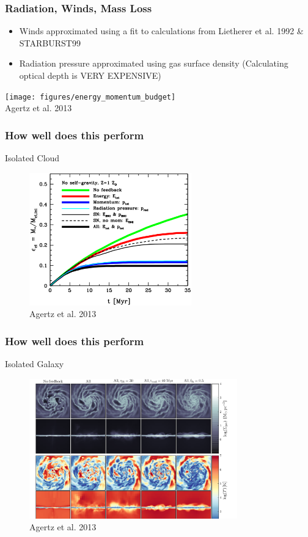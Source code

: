 \documentclass[serif,mathserif]{beamer}
\begin{document}
\begin{frame}
	\frametitle{Radiation, Winds, Mass Loss}
	\begin{itemize}
		\item Winds approximated using a fit to calculations from Lietherer et
			al. 1992 \& STARBURST99
		\item Radiation pressure approximated using gas surface density
			(Calculating optical depth is VERY EXPENSIVE)
	\end{itemize}
			\texttt{[image: figures/energy\_momentum\_budget]}\\
			\tiny{Agertz et al. 2013}
\end{frame}

\begin{frame}
	\frametitle{How well does this perform}
	Isolated Cloud
	\begin{figure}[t]
	\centering
	\includegraphics[width=7cm]{figures/cloud}\\
	\tiny{Agertz et al. 2013}
	\end{figure}
\end{frame}


\begin{frame}
	\frametitle{How well does this perform}
	Isolated Galaxy
	\begin{figure}[t]
	\centering
	\includegraphics[width=9cm]{figures/galaxy}\\
	\tiny{Agertz et al. 2013}
	\end{figure}
\end{frame}
\end{document}
